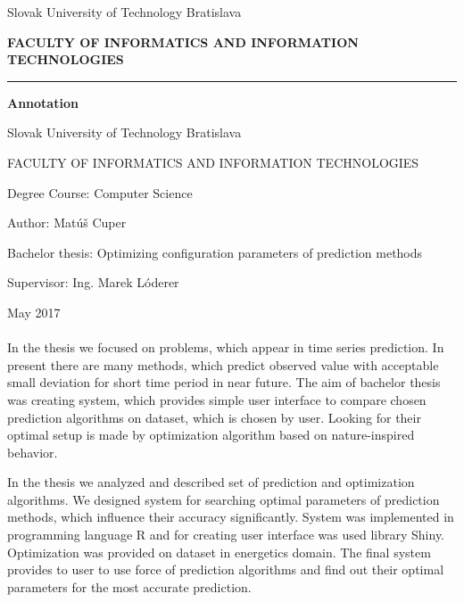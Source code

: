 \documentclass[a4paper,slovak,12pt,appendix]{article}
\begin{document}
\begin{titlepage}
\begin{center}
  {\small Slovak University of Technology Bratislava \par}
  {\small \textbf{FACULTY OF INFORMATICS AND INFORMATION TECHNOLOGIES}}
  \rule{\textwidth}{1pt}

  \vspace*{1.5cm}
  \begin{Large}
    \textbf{Annotation} \par
  \end{Large}
\end{center}
{Slovak University of Technology Bratislava \par}
{FACULTY OF INFORMATICS AND INFORMATION TECHNOLOGIES \par}
{Degree Course: Computer Science \par}
{Author: Matúš Cuper \par}
{Bachelor thesis: Optimizing configuration parameters of prediction methods \par}
{Supervisor: Ing. Marek Lóderer \par}
{May 2017 \\} \\
In the thesis we focused on problems, which appear in time series prediction.
In present there are many methods, which predict observed value with acceptable
small deviation for short time period in near future. The aim of bachelor
thesis was creating system, which provides simple user interface to compare
chosen prediction algorithms on dataset, which is chosen by user. Looking for
their optimal setup is made by optimization algorithm based on nature-inspired
behavior.

In the thesis we analyzed and described set of prediction and optimization
algorithms. We designed system for searching optimal parameters of prediction
methods, which influence their accuracy significantly. System was implemented
in programming language R and for creating user interface was used library
Shiny. Optimization was provided on dataset in energetics domain. The final
system provides to user to use force of prediction algorithms and find out
their optimal parameters for the most accurate prediction.
\end{titlepage}

\end{document}
